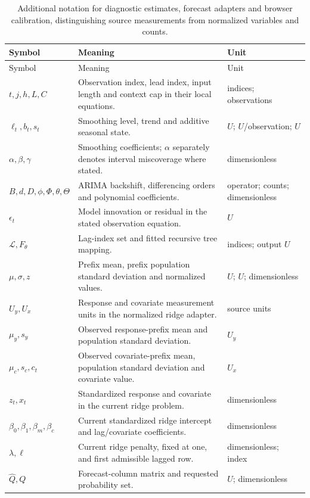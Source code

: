 
\begin{longtable}{>{\raggedright\arraybackslash}p{}>{\raggedright\arraybackslash}p{}>{\raggedright\arraybackslash}p{}}
\caption{Additional notation for diagnostic estimates, forecast adapters and browser calibration, distinguishing source measurements from normalized variables and counts.}\label{tab:report-symbols}\\
\toprule Symbol & Meaning & Unit\\\midrule\endfirsthead
\toprule Symbol & Meaning & Unit\\\midrule\endhead
$t,j,h,L,C$ & Observation index, lead index, input length and context cap in their local equations. & indices; observations\\
$\ell_t,b_t,s_t$ & Smoothing level, trend and additive seasonal state. & $U$; $U$/observation; $U$\\
$\alpha,\beta,\gamma$ & Smoothing coefficients; $\alpha$ separately denotes interval miscoverage where stated. & dimensionless\\
$B,d,D,\phi,\Phi,\theta,\Theta$ & ARIMA backshift, differencing orders and polynomial coefficients. & operator; counts; dimensionless\\
$\epsilon_t$ & Model innovation or residual in the stated observation equation. & $U$\\
$\mathcal L,F_\theta$ & Lag-index set and fitted recursive tree mapping. & indices; output $U$\\
$\mu,\sigma,z$ & Prefix mean, prefix population standard deviation and normalized values. & $U$; $U$; dimensionless\\
$U_y,U_x$ & Response and covariate measurement units in the normalized ridge adapter. & source units\\
$\mu_y,s_y$ & Observed response-prefix mean and population standard deviation. & $U_y$\\
$\mu_c,s_c,c_t$ & Observed covariate-prefix mean, population standard deviation and covariate value. & $U_x$\\
$z_t,x_t$ & Standardized response and covariate in the current ridge problem. & dimensionless\\
$\beta_0,\beta_1,\beta_m,\beta_c$ & Current standardized ridge intercept and lag/covariate coefficients. & dimensionless\\
$\lambda,\ell$ & Current ridge penalty, fixed at one, and first admissible lagged row. & dimensionless; index\\
$\widehat Q,Q$ & Forecast-column matrix and requested probability set. & $U$; dimensionless\\

\end{longtable}
